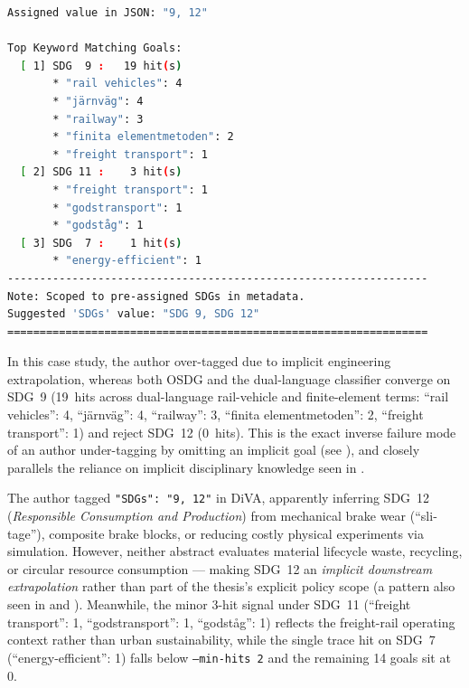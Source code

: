 \begin{casestudySection}
\begin{lstlisting}[language={bash}, basicstyle=\footnotesize, escapechar=|, breaklines=true,
    postbreak=\usebox{\lstbreakbox}, caption={Program's output}, label=lst:t_161329Output]
Assigned value in JSON: "9, 12"

Top Keyword Matching Goals:
  [ 1] SDG  9 :   19 hit(s)
       * "rail vehicles": 4
       * "järnväg": 4
       * "railway": 3
       * "finita elementmetoden": 2
       * "freight transport": 1
  [ 2] SDG 11 :    3 hit(s)
       * "freight transport": 1
       * "godstransport": 1
       * "godståg": 1
  [ 3] SDG  7 :    1 hit(s)
       * "energy-efficient": 1
-----------------------------------------------------------------
Note: Scoped to pre-assigned SDGs in metadata.
Suggested 'SDGs' value: "SDG 9, SDG 12"
=================================================================
\end{lstlisting}

In this case study, the author over-tagged due to implicit engineering extrapolation, whereas both OSDG and the dual-language classifier converge on \gls{SDG}~9 (\num{19}~hits across dual-language rail-vehicle and finite-element terms: \enquote{rail vehicles}: 4, \enquote{\foreignlanguage{swedish}{järnväg}}: 4, \enquote{railway}: 3, \enquote{\foreignlanguage{swedish}{finita elementmetoden}}: 2, \enquote{freight transport}: 1) and reject \gls{SDG}~12 (\num{0}~hits). This is the exact inverse failure mode of an author under-tagging by omitting an implicit goal (see ), and closely parallels the reliance on implicit disciplinary knowledge seen in .

The author tagged \texttt{"SDGs": "9, 12"} in \gls{DiVA}, apparently inferring \gls{SDG}~12 (\emph{Responsible Consumption and Production}) from mechanical brake wear (\enquote{\foreignlanguage{swedish}{slitage}}), composite brake blocks, or reducing costly physical experiments via simulation. However, neither abstract evaluates material lifecycle waste, recycling, or circular resource consumption --- making \gls{SDG}~12 an \textit{implicit downstream extrapolation} rather than part of the thesis's explicit policy scope (a pattern also seen in  and ). Meanwhile, the minor \num{3}-hit signal under \gls{SDG}~11 (\enquote{freight transport}: 1, \enquote{\foreignlanguage{swedish}{godstransport}}: 1, \enquote{\foreignlanguage{swedish}{godståg}}: 1) reflects the freight-rail operating context rather than urban sustainability, while the single trace hit on \gls{SDG}~7 (\enquote{energy-efficient}: 1) falls below \texttt{--min-hits 2} and the remaining \num{14} goals sit at \num{0}.
\end{casestudySection}

